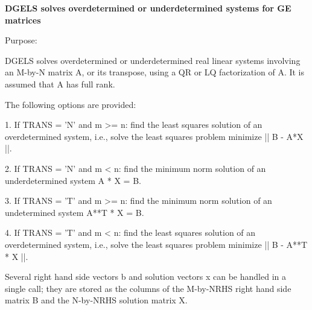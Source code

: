 {\bfseries  D\+G\+E\+L\+S solves overdetermined or underdetermined systems for G\+E matrices} 

 \begin{DoxyParagraph}{Purpose\+: }
\begin{DoxyVerb} DGELS solves overdetermined or underdetermined real linear systems
 involving an M-by-N matrix A, or its transpose, using a QR or LQ
 factorization of A.  It is assumed that A has full rank.

 The following options are provided:

 1. If TRANS = 'N' and m >= n:  find the least squares solution of
    an overdetermined system, i.e., solve the least squares problem
                 minimize || B - A*X ||.

 2. If TRANS = 'N' and m < n:  find the minimum norm solution of
    an underdetermined system A * X = B.

 3. If TRANS = 'T' and m >= n:  find the minimum norm solution of
    an undetermined system A**T * X = B.

 4. If TRANS = 'T' and m < n:  find the least squares solution of
    an overdetermined system, i.e., solve the least squares problem
                 minimize || B - A**T * X ||.

 Several right hand side vectors b and solution vectors x can be
 handled in a single call; they are stored as the columns of the
 M-by-NRHS right hand side matrix B and the N-by-NRHS solution
 matrix X.\end{DoxyVerb}
 
\end{DoxyParagraph}

